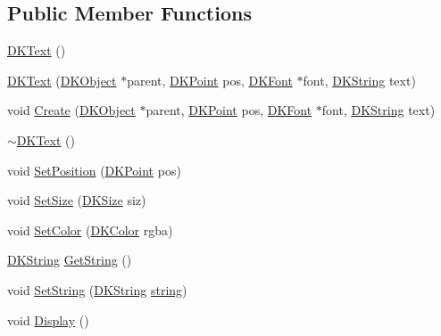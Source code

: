 \subsection*{Public Member Functions}
\begin{DoxyCompactItemize}
\item 
\hyperlink{class_d_k_text_ae1d19c4a4596dfec2a42019de76b57bf}{D\-K\-Text} ()
\item 
\hyperlink{class_d_k_text_ae110d8a859fe8737fdbaf0af2860333a}{D\-K\-Text} (\hyperlink{class_d_k_object}{D\-K\-Object} $\ast$parent, \hyperlink{_d_k_axis_8h_a0ca1f005fbb936f8e7a7f2433591f418}{D\-K\-Point} pos, \hyperlink{class_d_k_font}{D\-K\-Font} $\ast$font, \hyperlink{_d_k_string_8h_ac168e8555ceba18e1a2919b21976bc84}{D\-K\-String} text)
\item 
void \hyperlink{class_d_k_text_a94b6dfdb092fd23a71f8524fef0e4d37}{Create} (\hyperlink{class_d_k_object}{D\-K\-Object} $\ast$parent, \hyperlink{_d_k_axis_8h_a0ca1f005fbb936f8e7a7f2433591f418}{D\-K\-Point} pos, \hyperlink{class_d_k_font}{D\-K\-Font} $\ast$font, \hyperlink{_d_k_string_8h_ac168e8555ceba18e1a2919b21976bc84}{D\-K\-String} text)
\item 
\hyperlink{class_d_k_text_a5735bfd33a98e35c31f85ea6c7a49194}{$\sim$\-D\-K\-Text} ()
\item 
void \hyperlink{class_d_k_text_a494ce12704ae6201b33cc95948f53f77}{Set\-Position} (\hyperlink{_d_k_axis_8h_a0ca1f005fbb936f8e7a7f2433591f418}{D\-K\-Point} pos)
\item 
void \hyperlink{class_d_k_text_a65fe7a2182b48a4b0abb98890aaa6708}{Set\-Size} (\hyperlink{_d_k_axis_8h_aaa25a8c7cbf504fffdb8a4208ff7a731}{D\-K\-Size} siz)
\item 
void \hyperlink{class_d_k_text_a50dbb4eaf0711f53f6b8e25992d28134}{Set\-Color} (\hyperlink{class_d_k_color}{D\-K\-Color} rgba)
\item 
\hyperlink{_d_k_string_8h_ac168e8555ceba18e1a2919b21976bc84}{D\-K\-String} \hyperlink{class_d_k_text_a56db4c25647acab0a04d65ad360ddc46}{Get\-String} ()
\item 
void \hyperlink{class_d_k_text_ae48c7dc7300faf8efeb94ccbf4f25e80}{Set\-String} (\hyperlink{_d_k_string_8h_ac168e8555ceba18e1a2919b21976bc84}{D\-K\-String} \hyperlink{class_d_k_text_ac5c21a7548ea7a1aad9eff22155e2583}{string})
\item 
void \hyperlink{class_d_k_text_ad4d119e6380def0d1b8aac27ec465766}{Display} ()
\end{DoxyCompactItemize}
